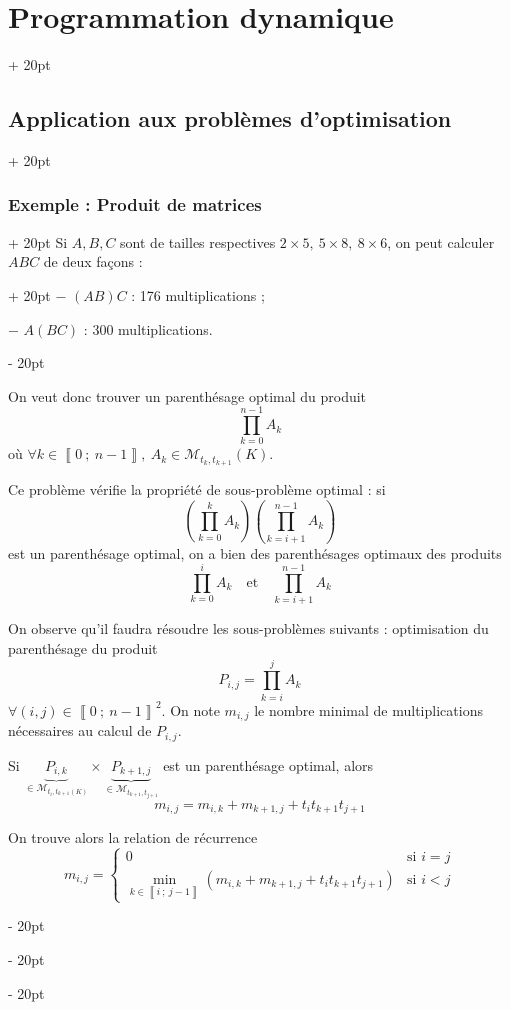\documentclass[a4paper, 12pt, twoside]{article}
\newcommand{\nset}[2]{\left\llbracket #1\ ;\ #2 \right\rrbracket}
\newcommand{\lr}[1]{\left( #1 \right)}
\newcommand{\ind}[1][20pt]{\advance\leftskip + #1}
\newcommand{\deind}[1][20pt]{\advance\leftskip - #1}
\newenvironment{indt}[2][20pt]{#2 \par \ind[#1]}{\par \deind} %
\begin{document}
\begin{indt}{\section{Programmation dynamique}}
\begin{indt}{\subsection{Application aux problèmes d'optimisation}}
\begin{indt}{\subsubsection{Exemple : Produit de matrices}}
                \begin{indt}{Si $A, B, C$ sont de tailles respectives $2 \times 5,\ 5 \times 8,\ 8 \times 6$, on peut calculer $ABC$ de deux façons :}
                    $-$ $(AB)C$ : 176 multiplications ;
                    
                    $-$ $A(BC)$ : 300 multiplications.
                \end{indt}
                
                On veut donc trouver un parenthésage optimal du produit
                    \[ \prod_{k = 0}^{n - 1} A_k \]
                où $\forall k \in \nset{0}{n - 1},\ A_k \in \mathcal M_{t_k, t_{k + 1}} (K)$.
                
                \vspace{12pt}
                
                Ce problème vérifie la propriété de sous-problème optimal : si
                    \[ \lr{ \prod_{k = 0}^k A_k } \lr{ \prod_{k = i + 1}^{n - 1} A_k } \]
                est un parenthésage optimal, on a bien des parenthésages optimaux des produits
                    \[ \prod_{k = 0}^i A_k \quad \text{et} \quad \prod_{k = i + 1}^{n - 1} A_k \]
                
                On observe qu'il faudra résoudre les sous-problèmes suivants : optimisation du parenthésage du produit
                    \[ P_{i, j} = \prod_{k = i}^j A_k \]
                $\forall (i, j) \in \nset 0 {n - 1}^2$. On note $m_{i, j}$ le nombre minimal de multiplications nécessaires au calcul de $P_{i, j}$.
                
                Si $\underbrace{P_{i, k}}_{\in \mathcal M_{t_i, t_{k + 1} (K)}} \times \underbrace{P_{k + 1, j}}_{\in \mathcal M_{t_{k + 1}, t_{j + 1}}}$ est un parenthésage optimal, alors
                    \[ m_{i, j} = m_{i, k} + m_{k + 1, j} + t_i t_{k + 1} t_{j + 1} \]
                
                On trouve alors la relation de récurrence
                    \[
                        m_{i, j} =
                        \left\{
                        \begin{array}{ll}
                            0
                            & \text{si $i = j$}
                            \\
                            \min\limits_{k \in \nset{i}{j - 1}} \lr{ m_{i, k} + m_{k + 1, j} + t_i t_{k + 1} t_{j + 1} }
                            & \text{si $i < j$}
                        \end{array}
                        \right.
                    \]
                

\end{indt}
\end{indt}
\end{indt}
\end{document}
